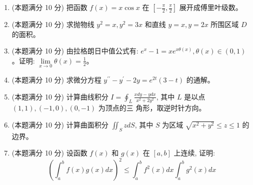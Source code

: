 \begin{enumerate}


\item 
(本题满分 10 分)
把函数 $f(x)=x \cos x$ 在 $\left[-\frac{\pi}{2}, \frac{\pi}{2}\right]$ 展开成傅里叶级数。




\item 
(本题满分 10 分)
求抛物线 $y^{2}=x, y^{2}=3 x$ 和直线 $y=x, y=2 x$ 所围区域 $D$ 的面积。






\item 
(本题满分 10 分)
由拉格朗日中值公式有: $e^{x}-1=x e^{x \theta(x)}, \theta(x) \in(0,1)$ 。证明: $\lim\limits _{x \rightarrow 0} \theta(x)=\frac{1}{2}$。



\newpage
\item 
(本题满分 10 分)
求微分方程 $y^{\prime \prime}-y^{\prime}-2 y=e^{2 t}(3-t)$ 的通解。




\item 
(本题满分 10 分)
计算曲线积分 $I=\oint_{L} \frac{x d y-y d x}{x^{2}+2 y^{2}}$, 其中 $L$ 是以点 $(1,1),(-1,0),(0,-1)$ 为顶点的三 角形，取逆时针方向。



\item 
(本题满分 10 分)
计算曲面积分 $\iint_{S} z d S$, 其中 $S$ 为区域 $\sqrt{x^{2}+y^{2}} \leqslant z \leqslant 1$ 的边界。



\item 
(本题满分 10 分)
设函数 $f(x)$ 和 $g(x)$ 在 $[a, b]$ 上连续, 证明:
\[
\left(\int_{a}^{b} f(x) g(x) d x\right)^{2} \leq \int_{a}^{b} f^{2}(x) d x \int_{a}^{b} g^{2}(x) d x
\]




\end{enumerate}
